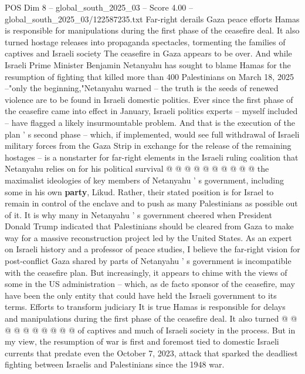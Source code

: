\begin{textsample}{POS Dim 8 – global\_south\_2025\_03 – Score 4.00 – global\_south\_2025\_03/122587235.txt}  \label{ex:f8_pos_380}
Far-right derails Gaza peace efforts Hamas is responsible for manipulations during the first phase of the ceasefire deal.
It also turned hostage releases into propaganda spectacles, tormenting the families of captives and Israeli society The ceasefire in Gaza appears to be over.
And while Israeli Prime Minister Benjamin Netanyahu has sought to blame Hamas for the resumption of fighting that killed more than 400 Palestinians on March 18, 2025 --"only the beginning,"Netanyahu warned -- the truth is the seeds of renewed violence are to be found in Israeli domestic politics.
Ever since the first phase of the ceasefire came into effect in January, Israeli politics experts -- myself included -- have flagged a likely insurmountable problem.
And that is the execution of the plan ' s second phase -- which, if implemented, would see full withdrawal of Israeli military forces from the Gaza Strip in exchange for the release of the remaining hostages -- is a nonstarter for far-right elements in the Israeli ruling coalition that Netanyahu relies on for his political survival @ @ @ @ @ @ @ @ @ @ the maximalist ideologies of key members of Netanyahu ' s government, including some in his own \textbf{party}, Likud.
Rather, their stated position is for Israel to remain in control of the enclave and to push as many Palestinians as possible out of it.
It is why many in Netanyahu ' s government cheered when President Donald Trump indicated that Palestinians should be cleared from Gaza to make way for a massive reconstruction project led by the United States.
As an expert on Israeli history and a professor of peace studies, I believe the far-right vision for post-conflict Gaza shared by parts of Netanyahu ' s government is incompatible with the ceasefire plan.
But increasingly, it appears to chime with the views of some in the US administration -- which, as de facto sponsor of the ceasefire, may have been the only entity that could have held the Israeli government to its terms.
Efforts to transform judiciary It is true Hamas is responsible for delays and manipulations during the first phase of the ceasefire deal.
It also turned @ @ @ @ @ @ @ @ @ @ of captives and much of Israeli society in the process.
But in my view, the resumption of war is first and foremost tied to domestic Israeli currents that predate even the October 7, 2023, attack that sparked the deadliest fighting between Israelis and Palestinians since the 1948 war.

\end{textsample}
